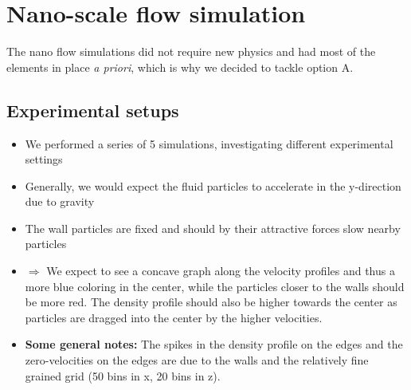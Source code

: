 \documentclass{article}
\begin{document}
\section{Nano-scale flow simulation}
\label{sec:nano}

The nano flow simulations did not require new physics and had most of the elements in place \textit{a priori}, which is why we decided to tackle option A.

\subsection{Experimental setups}
\label{sec:nano:exp}

    \begin{itemize}
        \item We performed a series of 5 simulations, investigating different experimental settings
        \item Generally, we would expect the fluid particles to accelerate in the y-direction due to gravity
        \item The wall particles are fixed and should by their attractive forces slow nearby particles
        \item[] \!\!\!\!\!\!\!\!\! $\Rightarrow$ We expect to see a concave graph along the velocity profiles and thus a more blue coloring in the center, while the particles closer to the walls should be more red. The density profile should also be higher towards the center as particles are dragged into the center by the higher velocities.
        \item \textbf{Some general notes:} The spikes in the density profile on the edges and the zero-velocities on the edges are due to the walls and the relatively fine grained grid (50 bins in x, 20 bins in z).
    \end{itemize}
\end{document}
